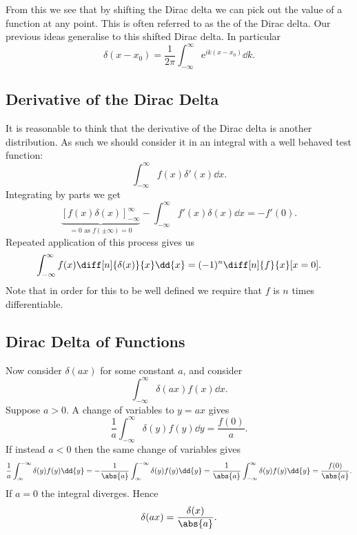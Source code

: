 \documentclass[fleqn]{NotesClass}
\newcommand*{\e}{\mathrm{e}}
\begin{document}
    From this we see that by shifting the Dirac delta we can pick out the value of a function at any point.
    This is often referred to as the  of the Dirac delta.
    Our previous ideas generalise to this shifted Dirac delta.
    In particular
    \begin{equation}
        \delta(x - x_0) = \frac{1}{2\pi} \int_{-\infty}^{\infty} \e^{ik(x - x_0)} \dd{k}.
    \end{equation}
    
    \subsection{Derivative of the Dirac Delta}
    It is reasonable to think that the derivative of the Dirac delta is another distribution.
    As such we should consider it in an integral with a well behaved test function:
    \begin{equation}
        \int_{-\infty}^{\infty} f(x)\delta'(x) \dd{x}.
    \end{equation}
    Integrating by parts we get
    \begin{equation}
        \underbrace{[f(x)\delta(x)]_{-\infty}^{\infty}}_{=0\text{ as } f(\pm \infty) = 0} - \int_{-\infty}^{\infty} f'(x)\delta(x) \dd{x} = -f'(0).
    \end{equation}
    Repeated application of this process gives us
    \begin{equation}
        \int_{-\infty}^{\infty} f(x) \diff[n]{\delta(x)}{x} \dd{x} = (-1)^n \diff[n]{f}{x}[x=0].
    \end{equation}
    Note that in order for this to be well defined we require that \(f\) is \(n\) times differentiable.
    
    \subsection{Dirac Delta of Functions}
    Now consider \(\delta(ax)\) for some constant \(a\), and consider
    \begin{equation}
        \int_{-\infty}^{\infty} \delta(ax)f(x) \dd{x}.
    \end{equation}
    Suppose \(a > 0\).
    A change of variables to \(y = ax\) gives
    \begin{equation}
        \frac{1}{a}\int_{-\infty}^{\infty} \delta(y)f(y) \dd{y} = \frac{f(0)}{a}.
    \end{equation}
    If instead \(a < 0\) then the same change of variables gives
    \begin{equation}
        \frac{1}{a}\int_{\infty}^{-\infty} \delta(y)f(y) \dd{y} = -\frac{1}{\abs{a}}\int_{\infty}^{-\infty} \delta(y)f(y) \dd{y} = \frac{1}{\abs{a}}\int_{-\infty}^{\infty} \delta(y)f(y) \dd{y} = \frac{f(0)}{\abs{a}}.
    \end{equation}
    If \(a = 0\) the integral diverges.
    Hence
    \begin{equation}
        \delta(ax) = \frac{\delta(x)}{\abs{a}}.
    \end{equation}
    
\end{document}
